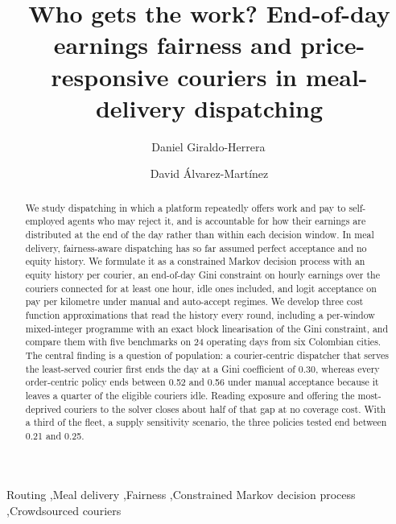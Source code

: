 \documentclass[a4paper,11pt,review,3p,authoryear]{elsarticle}
\begin{document}
\begin{frontmatter}

\title{Who gets the work? End-of-day earnings fairness and price-responsive couriers in meal-delivery dispatching}

\author[1]{Daniel Giraldo-Herrera\,}  
\author[1]{David \'Alvarez-Mart\'inez} 


\begin{abstract}
We study dispatching in which a platform repeatedly offers work and pay to self-employed agents who may reject it, and is accountable for how their earnings are distributed at the end of the day rather than within each decision window. In meal delivery, fairness-aware dispatching has so far assumed perfect acceptance and no equity history. We formulate it as a constrained Markov decision process with an equity history per courier, an end-of-day Gini constraint on hourly earnings over the couriers connected for at least one hour, idle ones included, and logit acceptance on pay per kilometre under manual and auto-accept regimes. We develop three cost function approximations that read the history every round, including a per-window mixed-integer programme with an exact block linearisation of the Gini constraint, and compare them with five benchmarks on 24 operating days from six Colombian cities. The central finding is a question of population: a courier-centric dispatcher that serves the least-served courier first ends the day at a Gini coefficient of 0.30, whereas every order-centric policy ends between 0.52 and 0.56 under manual acceptance because it leaves a quarter of the eligible couriers idle. Reading exposure and offering the most-deprived couriers to the solver closes about half of that gap at no coverage cost. With a third of the fleet, a supply sensitivity scenario, the three policies tested end between 0.21 and 0.25.
\end{abstract}

\begin{keyword}
Routing \sep Meal delivery \sep Fairness \sep Constrained Markov decision process \sep Crowdsourced couriers
\end{keyword}

\end{frontmatter}
\end{document}
